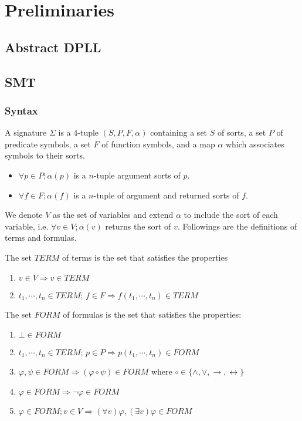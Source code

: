 \chapter{Preliminaries}
\section{Abstract DPLL}


\section{SMT}
\subsection{Syntax} \label{subsection:smt-syntax}
\begin{definition}
A signature $\Sigma$ is a 4-tuple $(S, P, F, \alpha)$ containing a set $S$ of sorts, a set $P$ of predicate symbols, a set $F$ of function symbols, and a map $\alpha$ which associates symbols to their sorts.
\begin{itemize}
\item $\forall p \in P; \alpha(p)$ is a $n$-tuple argument sorts of $p$.
\item $\forall f \in F; \alpha(f)$ is a $n$-tuple of argument and returned sorts of $f$.
\end{itemize}
\end{definition}


We denote $V$ as the set of variables and extend $\alpha$ to include the sort of each variable, i.e. $\forall v \in V; \alpha(v)$ returns the sort of $v$. Followings are the definitions of terms and formulas.

\begin{definition}
The set $TERM$ of terms is the set that satisfies the properties
\begin{enumerate}
\item $v \in V \Rightarrow v \in TERM$
\item $t_1,\cdots,t_n \in TERM$; $f \in F \Rightarrow f(t_1,\cdots, t_n) \in TERM$
\end{enumerate}
\end{definition}

\begin{definition}
The set $FORM$ of formulas is the set that satisfies the properties:
\begin{enumerate}
\item $\bot \in FORM$
\item $t_1,\cdots,t_n \in TERM$; $p \in P \Rightarrow p(t_1,\cdots, t_n) \in FORM$
\item $\varphi, \psi \in FORM \Rightarrow (\varphi \circ \psi) \in FORM$ where $\circ \in \{\wedge, \vee, \rightarrow, \leftrightarrow\}$
\item $\varphi \in FORM \Rightarrow \neg\varphi \in FORM$
\item $\varphi \in FORM; v \in V \Rightarrow (\forall v)\varphi, (\exists v)\varphi \in FORM$
\end{enumerate}
\end{definition}

